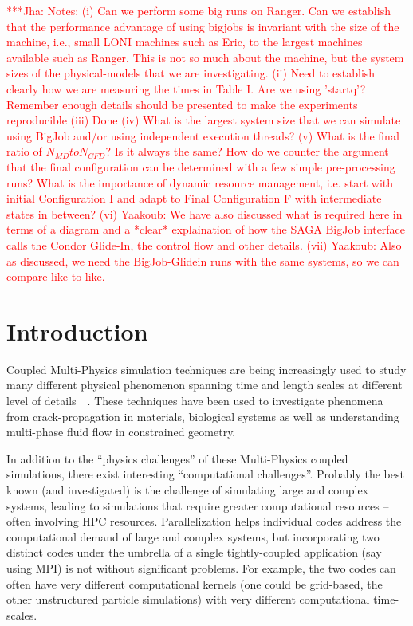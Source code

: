 \documentclass[conference,final]{IEEEtran}
\newcommand{\jhanote}[1]{ {\textcolor{red} { ***Jha: #1 }}}
\newcommand{\jhanote}[1]{}
\begin{document}
\jhanote{Notes: (i) Can we perform some big runs on Ranger. Can we
  establish that the performance advantage of using bigjobs is
  invariant with the size of the machine, i.e., small LONI machines
  such as Eric, to the largest machines available such as Ranger. This
  is not so much about the machine, but the system sizes of the
  physical-models that we are investigating. (ii) Need to establish
  clearly how we are measuring the times in Table I. Are we using
  'startq'? Remember enough details should be presented to make the
  experiments reproducible (iii) Done %
 (iv) What is the largest system size that we can simulate using BigJob and/or
  using independent execution threads? (v) What is the final ratio of
  $N_{MD} to N_{CFD}$? Is it always the same? How do we counter the
  argument that the final configuration can be determined with a few
  simple pre-processing runs? What is the importance of dynamic
  resource management, i.e. start with initial Configuration I and
  adapt to Final Configuration F with intermediate states in between?
 (vi) Yaakoub: We have also discussed what is required here in terms
  of a diagram and a *clear* explaination of how the SAGA BigJob
  interface calls the Condor Glide-In, the control flow and other
  details. (vii) Yaakoub: Also as discussed, we need the
  BigJob-Glidein runs with the same systems, so we can compare like to
  like.}


\section{Introduction}

Coupled Multi-Physics simulation techniques are being increasingly
used to study many different physical phenomenon spanning time and
length scales at different level of
details~\cite{Tai}~\cite{Watanabe}. These techniques have been used to
investigate phenomena from crack-propagation in materials, biological
systems as well as understanding multi-phase fluid flow in constrained
geometry.

In addition to the ``physics challenges'' of these Multi-Physics
coupled simulations, there exist interesting ``computational
challenges''. Probably the best known (and investigated) is the
challenge of simulating large and complex systems, leading to
simulations that require greater computational resources -- often
involving HPC resources. %
Parallelization helps individual codes address the computational
demand of large and complex systems, but incorporating two distinct
codes under the umbrella of a single tightly-coupled application (say
using MPI) is not without significant problems. For example, the two
codes can often have very different computational kernels (one could
be grid-based, the other unstructured particle simulations) with very
different computational time-scales.
\end{document}
